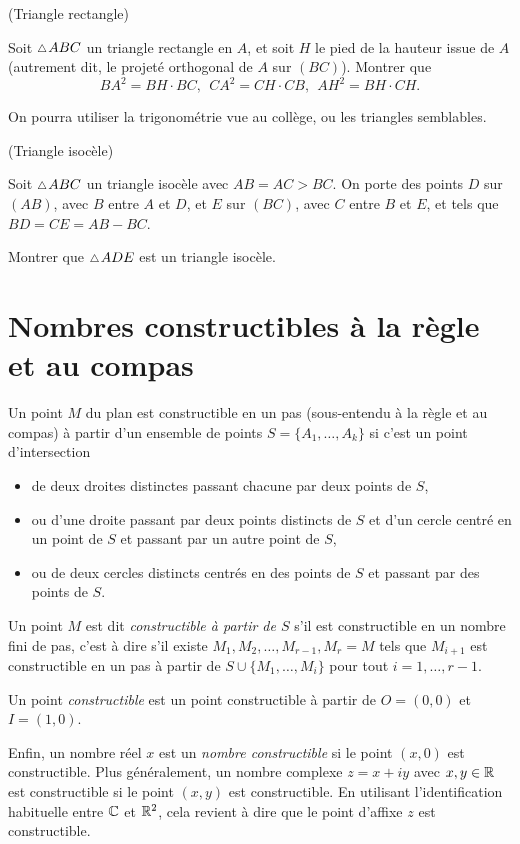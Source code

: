 \documentclass[a4paper,11pt,reqno]{amsart}
\begin{document}
\begin{exo} (Triangle rectangle)

  Soit $\tri ABC$ un triangle rectangle en $A$, et soit $H$ le pied de la hauteur issue de $A$ (autrement dit, le projeté orthogonal de $A$ sur $(BC)$).  Montrer que
  \[
    BA^2=BH \cdot BC,\ \ CA^2=CH \cdot CB,\ \ AH^2=BH \cdot CH.
  \]
  \begin{indication}
    On pourra utiliser la trigonométrie vue au collège, ou les triangles semblables.
  \end{indication}
\end{exo}


\begin{exo} (Triangle isocèle)

  Soit $\tri ABC$ un triangle isocèle avec $AB=AC > BC$. On porte des points $D$ sur $(AB)$, avec $B$ entre $A$ et $D$, et $E$ sur $(BC)$, avec $C$ entre $B$ et $E$, et tels que $BD=CE=AB-BC$.

  Montrer que $\tri ADE$ est un triangle isocèle.
\end{exo}


\section{Nombres constructibles à la règle et au compas}


\begin{convention}\small
  Un point $M$ du plan est constructible en un pas (sous-entendu à la règle et au compas) à partir d'un ensemble de points $S=\{A_1,\ldots,A_k\}$ si c'est un point d'intersection
  \begin{itemize}
    \item de deux droites distinctes passant chacune par deux points de $S$,
    \item ou d'une droite passant par deux points distincts de $S$ et d'un cercle centré en un point de $S$ et passant par un autre point de $S$,
    \item ou de deux cercles distincts centrés en des points de $S$ et passant par des points de $S$.
  \end{itemize}

  Un point $M$ est dit \emph{constructible à partir de $S$} s'il est constructible en un nombre fini de pas, c'est à dire s'il existe $M_1,M_2,\ldots,M_{r-1},M_r=M$ tels que $M_{i+1}$ est constructible en un pas à partir de $S \cup \{M_1,\ldots,M_{i}\}$ pour tout $i=1,\ldots,r-1$.

  Un point \emph{constructible} est un point constructible à partir de $O=(0,0)$ et $I=(1,0)$.

  Enfin, un nombre réel $x$ est un \emph{nombre constructible} si le point $(x,0)$ est constructible. Plus généralement, un nombre complexe $z=x+iy$ avec $x,y \in \mathbb{R}$ est constructible si le point $(x,y)$ est constructible. En utilisant l'identification habituelle entre $\mathbb{C}$ et $\mathbb{R}^2$,  cela revient à dire que le point d'affixe $z$ est constructible.
\end{convention}
\end{document}
